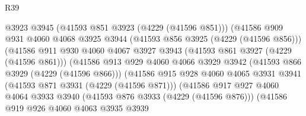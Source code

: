 \begin{lexlean}{R39}
\begin{coremodule}
                                    @3923
                                    @3945
                                    (@41593 @851 @3923 (@4229 (@41596 @851)))
                                    (@41586
                                      @909
                                      @931
                                      @4060
                                      @4068
                                      @3925
                                      @3944
                                      (@41593 @856 @3925 (@4229 (@41596 @856)))
                                      (@41586
                                        @911
                                        @930
                                        @4060
                                        @4067
                                        @3927
                                        @3943
                                        (@41593 @861 @3927 (@4229 (@41596 @861)))
                                        (@41586
                                          @913
                                          @929
                                          @4060
                                          @4066
                                          @3929
                                          @3942
                                          (@41593 @866 @3929 (@4229 (@41596 @866)))
                                          (@41586
                                            @915
                                            @928
                                            @4060
                                            @4065
                                            @3931
                                            @3941
                                            (@41593 @871 @3931 (@4229 (@41596 @871)))
                                            (@41586
                                              @917
                                              @927
                                              @4060
                                              @4064
                                              @3933
                                              @3940
                                              (@41593 @876 @3933 (@4229 (@41596 @876)))
                                              (@41586
                                                @919
                                                @926
                                                @4060
                                                @4063
                                                @3935
                                                @3939

\end{coremodule}
\end{lexlean}
